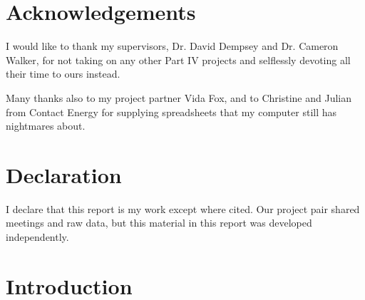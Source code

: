 \documentclass[a4paper, 12pt]{article}
\begin{document}
\newpage
{}
\section*{Acknowledgements}
I would like to thank my supervisors, Dr. David Dempsey and Dr. Cameron Walker, for not taking on any other Part IV projects and selflessly devoting all their time to ours instead.

Many thanks also to my project partner Vida Fox, and to Christine and Julian from Contact Energy for supplying spreadsheets that my computer still has nightmares about.

\vfill
\section*{Declaration}
I declare that this report is my work except where cited. Our project pair shared meetings and raw data, but this material in this report was developed independently.

\newpage
{}

\begin{multicols}{2}
\begin{spacing}{0}
\setcounter{tocdepth}{2}
\tableofcontents
\end{spacing}
\end{multicols}

\newpage
{}
\setcounter{page}{1}
\pagestyle{fancy}

\section{Introduction}
\end{document}
